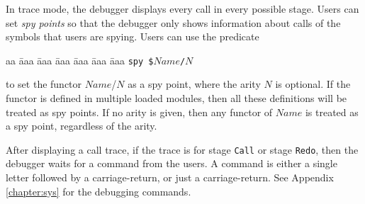 In trace mode, the debugger displays every call in every possible stage. Users can set \emph{spy points} so that the debugger only shows information about calls of the symbols that users are spying. Users can use the predicate 
\begin{tabbing}
aa \= aaa \= aaa \= aaa \= aaa \= aaa \= aaa \kill
\> \texttt{spy \$$Name$/$N$} 
\end{tabbing}
to set the functor $Name$/$N$ as a spy point, where the arity $N$ is optional. If the functor is defined in multiple loaded modules, then all these definitions will be treated as spy points. If no arity is given, then any functor of $Name$ is treated as a spy point, regardless of the arity.

After displaying a call trace, if the trace is for stage \texttt{Call} or stage \texttt{Redo}, then the debugger waits for a command from the users. A command is either a single letter followed by a carriage-return, or just a carriage-return. See Appendix \ref{chapter:sys} for the debugging commands.

